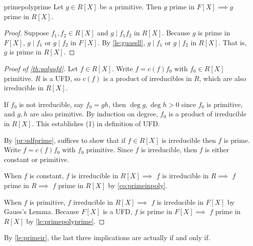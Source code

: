 \begin{lemma}{}{primepolyprime}
    Let \(g \in R[X]\) be a primitive. Then \(g\) prime in \(F[X] \implies g\) prime in \(R[X]\).
\end{lemma}
\begin{proof}
    Suppose \(f_1, f_2 \in R[X]\) and \(g \mid f_1 f_2\) in \(R[X]\). Because \(g\) is prime in \(F[X]\), \(g \mid f_1\) or \(g \mid f_2\) in \(F[X]\). By \cref{le:guassll}, \(g \mid f_1\) or \(g \mid f_2\) in \(R[X]\). That is, \(g\) is prime in \(R[X]\).
\end{proof}
\begin{proof}[Proof of \cref{th:polyufd}]
    Let \(f \in R[X]\). Write \(f = c(f) f_0\) with \(f_0\in R[X]\) primitive. \(R\) is a UFD, so \(c(f)\) is a product of irreducibles in \(R\), which are also irreducible in \(R[X]\).

    If \(f_0\) is not irreducible, say \(f_0 = gh\), then \(\deg g, \deg h > 0\) since \(f_0\) is primitive, and \(g, h\) are also primitive. By induction on degree, \(f_0\) is a product of irreducible in \(R[X]\). This establishes (1) in definition of UFD.

    By \cref{pr:udfprime}, suffices to show that if \(f\in R[X]\) is irreducible then \(f\) is prime. Write \(f = c(f) f_0\) with \(f_0\) primitive. Since \(f\) is irreducible, then \(f\) is either constant or primitive.

    When \(f\) is constant, \(f\) is irreducible in \(R[X] \implies\) \(f\) is irreducible in \(R\implies\) \(f\) prime in \(R\implies\) \(f\) prime in \(R[X]\) by \cref{co:primeinpoly}.

    When \(f\) is primitive, \(f\) irreducible in \(R[X]\implies \) \(f\) is irreducible in \(F[X]\) by Gauss's Lemma. Because \(F[X]\) is a UFD, \(f\) is prime in \(F[X]\implies\) \(f\) prime in \(R[X]\) by \cref{le:primepolyprime}.
\end{proof}
\begin{remark}
    By \cref{le:primeir}, the last three implications are actually if and only if.
\end{remark}